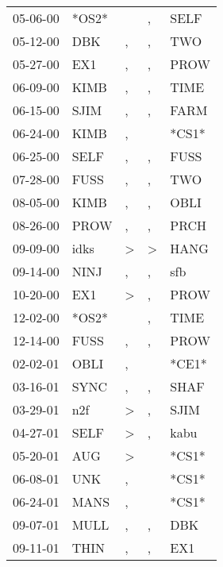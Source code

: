 \begin{supertabular}{lllll}
 05-06-00 &  *OS2* &               &                , &   SELF \\
 05-12-00 &    DBK &             , &                , &    TWO \\
 05-27-00 &    EX1 &             , &                , &   PROW \\
 06-09-00 &   KIMB &             , &                , &   TIME \\
 06-15-00 &   SJIM &             , &                , &   FARM \\
 06-24-00 &   KIMB &             , &                  &  *CS1* \\
 06-25-00 &   SELF &             , &                , &   FUSS \\
 07-28-00 &   FUSS &             , &                , &    TWO \\
 08-05-00 &   KIMB &             , &                , &   OBLI \\
 08-26-00 &   PROW &             , &                , &   PRCH \\
 09-09-00 &   idks &  \textgreater &     \textgreater &   HANG \\
 09-14-00 &   NINJ &             , &                , &    sfb \\
 10-20-00 &    EX1 &  \textgreater &                , &   PROW \\
 12-02-00 &  *OS2* &               &                , &   TIME \\
 12-14-00 &   FUSS &             , &                , &   PROW \\
 02-02-01 &   OBLI &             , &                  &  *CE1* \\
 03-16-01 &   SYNC &             , &                , &   SHAF \\
 03-29-01 &    n2f &  \textgreater &                , &   SJIM \\
 04-27-01 &   SELF &  \textgreater &                , &   kabu \\
 05-20-01 &    AUG &  \textgreater &                  &  *CS1* \\
 06-08-01 &    UNK &             , &                  &  *CS1* \\
 06-24-01 &   MANS &             , &                  &  *CS1* \\
 09-07-01 &   MULL &             , &                , &    DBK \\
 09-11-01 &   THIN &             , &                , &    EX1 \\

\end{supertabular}
